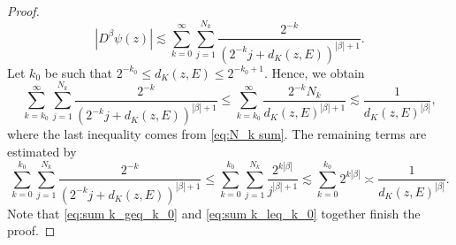 \documentclass[a4paper,12pt]{amsart}
\theoremstyle{definition}
\theoremstyle{remark}
\begin{document}
\begin{proof}
\begin{equation*}
            |D^{\beta} \psi(z)| \lesssim  \sum_{k = 0}^\infty \sum_{j = 1}^{N_k} \frac{2^{-k}}{\left(2^{-k} j+ d_K(z,E) \right)^{|\beta|+1}}.
        \end{equation*}
        Let $k_0$ be such that $2^{-k_0} \leq d_K(z,E) \leq 2^{-k_0+1}$. Hence, we obtain
        \begin{equation} \label{eq:sum k_geq_k_0}
            \sum_{k = k_0}^\infty \sum_{j = 1}^{N_k} \frac{2^{-k}}{\left(2^{-k} j+ d_K(z,E) \right)^{|\beta|+1}} \leq \sum_{k = k_0}^\infty \frac{2^{-k} N_k}{ d_K(z,E) ^{|\beta|+1}} \lesssim \frac{1}{ d_K(z,E) ^{|\beta|}},
        \end{equation}
        where the last inequality comes from \eqref{eq:N_k sum}. The remaining terms are estimated by
        \begin{equation} \label{eq:sum k_leq_k_0}
            \sum_{k = 0}^{k_0} \sum_{j = 1}^{N_k} \frac{2^{-k}}{\left(2^{-k} j+ d_K(z,E) \right)^{|\beta|+1}} \leq \sum_{k = 0}^{k_0} \sum_{j = 1}^{N_k} \frac{2^{k|\beta|}}{ j ^{|\beta|+1}} \lesssim \sum_{k = 0}^{k_0} 2^{k|\beta|} \asymp \frac{1}{ d_K(z,E) ^{|\beta|}}. 
        \end{equation}
        Note that \eqref{eq:sum k_geq_k_0} and \eqref{eq:sum k_leq_k_0} together finish the proof.
    \end{proof}
\end{document}
